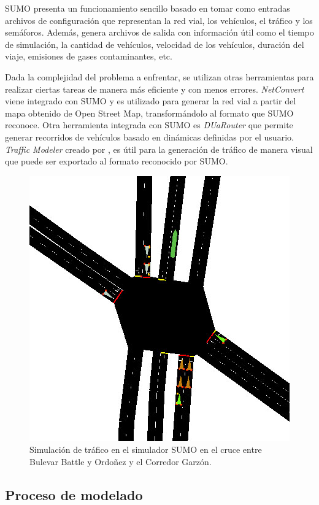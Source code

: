 SUMO presenta un funcionamiento sencillo basado en tomar como entradas archivos de configuración que representan la red vial, los vehículos, el tráfico y los semáforos. Además, genera archivos de salida con información útil como el tiempo de simulación, la cantidad de vehículos, velocidad de los vehículos, duración del viaje, emisiones de gases contaminantes, etc. 

Dada la complejidad del problema a enfrentar, se utilizan otras herramientas para realizar ciertas tareas de manera más eficiente y con menos errores. \emph{NetConvert} viene integrado con SUMO y es utilizado para generar la red vial a partir del mapa obtenido de Open Street Map, transformándolo al formato que SUMO reconoce. Otra herramienta integrada con SUMO es \emph{DUaRouter} que permite generar recorridos de vehículos basado en dinámicas definidas por el usuario. \emph{Traffic Modeler} creado por \citet{TrafficModeler}, es útil para la generación de tráfico de manera visual que puede ser exportado al formato reconocido por SUMO. 
	


\begin{figure}[H]
	\centering
	\includegraphics[width=0.7\linewidth]{Figures/sim1}
	\caption[Simulación de trafico en el simulador SUMO.]{Simulación de tráfico en el simulador SUMO en el cruce entre Bulevar Battle y Ordoñez y el Corredor Garzón.}
	\label{fig:sim1}
\end{figure}



\subsection{Proceso de modelado}

